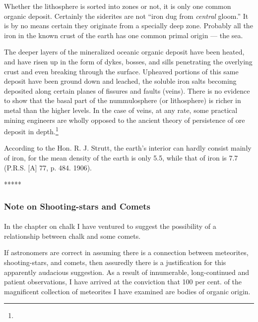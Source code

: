 \documentclass[a4paper, 12pt, oneside]{article}
\begin{document}
Whether the lithosphere is sorted into zones or not, it is only one common organic deposit. Certainly the siderites are not ``iron dug from \emph{central} gloom.'' It is by no means certain they originate from a specially deep zone. Probably all the iron in the known crust of the earth has one common primal origin --- the sea.

The deeper layers of the mineralized oceanic organic deposit have been heated, and have risen up in the form of dykes, bosses, and sills penetrating the overlying crust and even breaking through the surface. Upheaved portions of this same deposit have been ground down and leached, the soluble iron salts becoming deposited along certain planes of fissures and faults (veins). There is no evidence to show that the basal part of the nummulosphere (or lithosphere) is richer in metal than the higher levels. In the case of veins, at any rate, some practical mining engineers are wholly opposed to the ancient theory of persistence of ore deposit in depth.\footnote{}

According to the Hon. R. J. Strutt, the earth's interior can hardly consist mainly of iron, for the mean density of the earth is only 5.5, while that of iron is 7.7 (P.R.S. [A] 77, p. 484. 1906).

\centerline{*\hspace{15mm}*\hspace{15mm}*\hspace{15mm}*\hspace{15mm}*}
\bigskip

\subsubsection{Note on Shooting-stars and Comets}
\paragraph{}
In the chapter on chalk I have ventured to suggest the possibility of a relationship between chalk and some comets.

If astronomers are correct in assuming there is a connection between meteorites, shooting-stars, and comets, then assuredly there is a justification for this apparently audacious suggestion. As a result of innumerable, long-continued and patient observations, I have arrived at the conviction that 100 per cent. of the magnificent collection of meteorites I have examined are bodies of organic origin.
\end{document}
